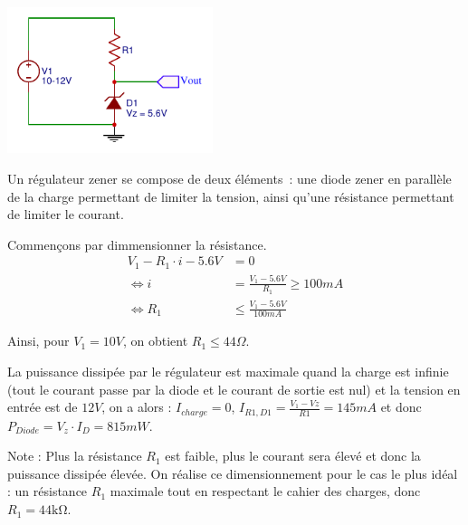 \documentclass{../template/tp}
\begin{document}
{%
\begin{center}
    \includegraphics[width=6cm]{corexzener}
\end{center}
Un régulateur zener se compose de deux éléments~: une diode zener en parallèle de la charge permettant de limiter la tension, ainsi qu'une résistance permettant de limiter le courant.

Commençons par dimmensionner la résistance.
\begin{align*}
V_1 - R_1 \cdot i - 5.6V & = 0 \\
\Leftrightarrow i & = \frac{V_1 - 5.6V}{R_1} \geq 100 mA \\
\Leftrightarrow R_1 & \leq \frac{V_1 - 5.6V}{100 mA}
\end{align*}

Ainsi, pour $V_1 = 10 V$, on obtient $R_1 \leq 44 \Omega$.


La puissance dissipée par le régulateur est maximale quand la charge est infinie (tout le courant passe par la diode et le courant de sortie est nul) et la tension en entrée est de $12V$, on a alors : $I_{charge}=0$, $I_{R1,D1} = \frac{V_1 - Vz}{R1} = 145mA$ et donc $P_{Diode} = V_z \cdot I_D = 815mW$.

Note : Plus la résistance $R_1$ est faible, plus le courant sera élevé et donc la puissance dissipée élevée. On réalise ce dimensionnement pour le cas le plus idéal : un résistance $R_1$ maximale tout en respectant le cahier des charges, donc $R_1 = 44 \si{\kohm}$.
}
\end{document}
